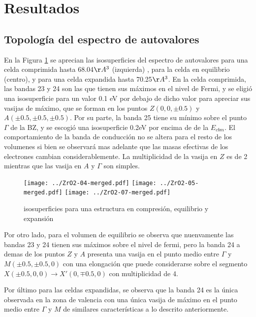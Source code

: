 \section{Resultados}

\subsection{Topología del espectro de autovalores}
En la Figura \ref{FigureIsosurfaces} se aprecian las isosuperficies del espectro de autovalores para
una celda comprimida hasta  68.04$\AA^3$ (izquierda) , para la celda en equilibrio (centro), y para una celda
expandida hasta 70.25$\AA^3$.  
En la celda comprimida, las bandas 23 y 24 son las que tienen sus máximos en el nivel de Fermi, 
y se eligió una isosuperficie para un valor 0.1 eV por debajo de dicho valor para apreciar sus vasijas de
máximo, que se forman en los puntos $Z (0, 0, \pm0.5)$ y $A (\pm0.5,\pm 0.5, \pm0.5)$. Por su parte, la 
banda 25 tiene su mínimo sobre el punto $\Gamma$ de la BZ, y se escogió una isosuperficie 0.2eV por 
encima de de la $E_{cbm}$. El comportamiento de la banda de conducción no se altera para 
el resto de los volumenes si bien se observará mas adelante que las masas efectivas de los electrones 
cambian considerablemente. La multiplicidad de la vasija en $Z$ es de 2 mientras que las
vasija en $A$ y $\Gamma$ son simples.

\begin{figure}
  \center %
  \texttt{[image: ../ZrO2-04-merged.pdf]}
  \texttt{[image: ../ZrO2-05-merged.pdf]}
  \texttt{[image: ../ZrO2-07-merged.pdf]}
  \caption{\protect\label{FigureIsosurfaces}
  isosuperficies  para una estructura en compresión, equilibrio y expansión}
\end{figure}

Por otro lado, para el volumen de equilibrio se observa que nuenvamente las bandas  23 y 24 
tienen sus máximos sobre el nivel de fermi, pero la banda 24 a demas de los puntos $Z$ y $A$
presenta una vasija en el punto medio entre $\Gamma$ y $M (\pm0.5, \pm0.5, 0)$ con una 
elongación que puede considerarse sobre el segmento $X (\pm0.5, 0, 0) \rightarrow X' (0, \mp0.5, 0)$ con 
multiplicidad de 4. 

Por último para las celdas expandidas, se observa que la banda 24 es la única observada en 
la zona de valencia con una única vasija de máximo en el punto medio entre $\Gamma$ y $M$ de 
similares características a lo descrito anteriormente.

